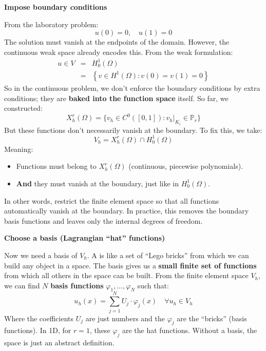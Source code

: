 \highspace
\begin{flushleft}
    \textcolor{Green3}{ \textbf{Impose boundary conditions}}
\end{flushleft}
From the laboratory problem:
\begin{equation*}
    u(0) = 0, \quad u(1) = 0
\end{equation*}
The solution must vanish at the endpoints of the domain. However, the continuous weak space already encodes this. From the weak formulation:
\begin{equation*}
    \begin{array}{rcl}
        u \in V &=& H^1_0(\Omega) \\[.3em]
        &=& \left\{ v \in H^1(\Omega) : v(0) = v(1) = 0 \right\}
    \end{array}
\end{equation*}
So in the continuous problem, we don't enforce the boundary conditions by extra conditions; they are \textbf{baked into the function space} itself. So far, we constructed:
\begin{equation*}
    X_h^r(\Omega) = \{ v_h \in C^0([0,1]) : v_h|_{K_i} \in \mathbb{P}_r \}
\end{equation*}
But these functions don't necessarily vanish at the boundary. To fix this, we take:
\begin{equation}\label{eq: Poisson 1D - Impose boundary conditions}
    V_h = X_h^r(\Omega) \cap H^1_0(\Omega)
\end{equation}
Meaning:
\begin{itemize}
    \item Functions must belong to $X_h^r(\Omega)$ (continuous, piecewise polynomials).
    \item \textbf{And} they must vanish at the boundary, just like in $H^{1}_{0}\left(\Omega\right)$.
\end{itemize}
In other words, restrict the finite element space so that all functions automatically vanish at the boundary. In practice, this removes the boundary basis functions and leaves only the internal degrees of freedom.

\newpage

\begin{flushleft}
    \textcolor{Green3}{ \textbf{Choose a basis (Lagrangian ``hat'' functions)}}
    \label{def: choose a Lagrangian basis}
\end{flushleft}
Now we need a basis of $V_h$. A  is like a set of ``Lego bricks'' from which we can build any object in a space. The basis gives us a \textbf{small finite set of functions} from which all others in the space can be built. From the finite element space $V_{h}$, we can find $N$ \textbf{basis functions} $\varphi_{1}, \dots, \varphi_{N}$ such that:
\begin{equation}
    u_{h}(x) = \displaystyle\sum_{j=1}^{N} U_{j} \cdot \varphi_{j}(x) \quad \forall u_h \in V_h
\end{equation}
Where the coefficients $U_{j}$ are just numbers and the $\varphi_{j}$ are the ``bricks'' (basis functions). In 1D, for $r=1$, these $\varphi_{j}$ are the hat functions. Without a basis, the space is just an abstract definition.

